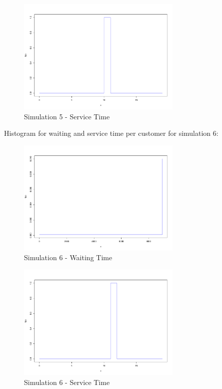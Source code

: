 \begin{figure}[H]
	\centering
  \includegraphics[width=0.7\textwidth]{serie_02/data/Simulation5/service_time.pdf}
	\caption{Simulation 5 - Service Time}
	\label{fig3}
\end{figure}
\newpage
Histogram for waiting and service time per customer for simulation $6$:\\

\begin{figure}[H]
	\centering
  \includegraphics[width=0.7\textwidth]{serie_02/data/Simulation6/waiting_time.pdf}
	\caption{Simulation 6 - Waiting Time}
	\label{fig3}
\end{figure}

\begin{figure}[H]
	\centering
  \includegraphics[width=0.7\textwidth]{serie_02/data/Simulation6/service_time.pdf}
	\caption{Simulation 6 - Service Time}
	\label{fig3}
\end{figure}

